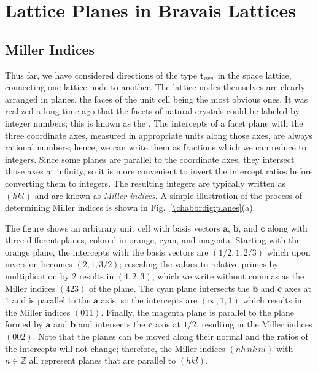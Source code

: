 \clearpage


\section{Lattice Planes in Bravais Lattices}\label{\chabbr:sec:planes}

\subsection{Miller Indices}\label{\chabbr:ssec:Miller}
Thus far, we have considered directions of the type $\mathbf{t}_{uvw}$ in the space lattice, connecting one lattice node to another.  The lattice nodes themselves are clearly arranged in planes, the faces of the unit cell being the most obvious ones.  It was realized a long time ago that the facets of natural crystals could be labeled by integer numbers; this is known as the .  The intercepts of a facet plane with the three coordinate axes, measured in appropriate units along those axes, are always rational numbers; hence, we can write them as fractions which we can reduce to integers.  Since some planes are parallel to the coordinate axes, they intersect those axes at infinity, so it is more convenient to invert the intercept ratios before converting them to integers.  The resulting integers are typically written as $(hkl)$ and are known as \textit{Miller indices}.  A simple illustration of the process of determining Miller indices is shown in Fig.~\ref{\chabbr:fig:planes}(a).

The figure shows an arbitrary unit cell with basis vectors $\mathbf{a}$, $\mathbf{b}$, and $\mathbf{c}$ along with three different planes, colored in orange, cyan, and magenta. Starting with the orange plane, the intercepts with the basis vectors are $(1/2,1,2/3)$ which upon inversion becomes $(2,1,3/2)$; rescaling the values to relative primes by multiplication by $2$ results in $(4,2,3)$, which we write without commas as the Miller indices $(423)$ of the plane. The cyan plane intersects the $\mathbf{b}$ and $\mathbf{c}$ axes at $1$ and is parallel to the $\mathbf{a}$ axis, so the intercepts are $(\infty,1,1)$ which results in the Miller indices $(011)$.  Finally, the magenta plane is parallel to the plane formed by $\mathbf{a}$ and $\mathbf{b}$ and intersects the $\mathbf{c}$ axis at $1/2$, resulting in the Miller indices $(002)$.  Note that the planes can be moved along their normal and the ratios of the intercepts will not change; therefore, the Miller indices $(nh\, nk\, nl)$ with $n\in\mathbb{Z}$ all represent planes that are parallel to $(hkl)$. 

